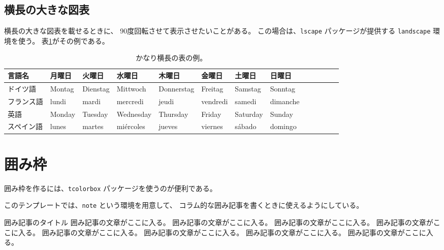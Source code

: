 \documentclass[ %
  uplatex,%
  a5paper,%
  papersize%
]{jsbook}
\begin{document}
\subsection{横長の大きな図表}

横長の大きな図表を載せるときに、
90度回転させて表示させたいことがある。
この場合は、\texttt{lscape} パッケージが提供する
\verb|landscape| 環境を使う。
表\ref{tb:wide-table-example}がその例である。

\begin{landscape}
  \begin{table}
    \caption{かなり横長の表の例。}
    \label{tb:wide-table-example}
    \begin{center}
      \begin{tabular}{lllllllllllll} \toprule
        言語名   & 月曜日     & 火曜日      & 水曜日       & 木曜日        & 金曜日       & 土曜日      & 日曜日      \\ \midrule
        ドイツ語  & Montag  & Dienstag & Mittwoch  & Donnerstag & Freitag   & Samstag  & Sonntag  \\
        フランス語 & lundi   & mardi    & mercredi  & jeudi      & vendredi  & samedi   & dimanche \\
        英語    & Monday  & Tuesday  & Wednesday & Thursday   & Friday    & Saturday & Sunday   \\
        スペイン語 & lunes   & martes   & miércoles & jueves     & viernes   & sábado   & domingo  \\ \bottomrule
      \end{tabular}
    \end{center}
  \end{table}
\end{landscape}

\section{囲み枠}

囲み枠を作るには、\texttt{tcolorbox} パッケージを使うのが便利である。

このテンプレートでは、\verb|note| という環境を用意して、
コラム的な囲み記事を書くときに使えるようにしている。

\begin{note}{囲み記事のタイトル}
囲み記事の文章がここに入る。
囲み記事の文章がここに入る。
囲み記事の文章がここに入る。
囲み記事の文章がここに入る。
囲み記事の文章がここに入る。
囲み記事の文章がここに入る。
囲み記事の文章がここに入る。
囲み記事の文章がここに入る。
\end{note}
\end{document}
